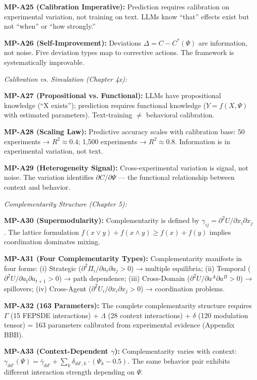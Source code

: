 \begin{tcolorbox}[colback=gray!5!white, colframe=gray!75!black,
    title=\textbf{MP Axioms}]
\textbf{MP-A25 (Calibration Imperative):} Prediction requires calibration on experimental variation, not training on text. LLMs know ``that'' effects exist but not ``when'' or ``how strongly.''

\textbf{MP-A26 (Self-Improvement):} Deviations $\Delta = C - C^*(\Psi)$ are information, not noise. Five deviation types map to corrective actions. The framework is systematically improvable.

\vspace{0.5em}
\textit{Calibration vs. Simulation (Chapter 4x):}

\textbf{MP-A27 (Propositional vs. Functional):} LLMs have propositional knowledge (``X exists''); prediction requires functional knowledge ($Y = f(X, \Psi)$ with estimated parameters). Text-training $\neq$ behavioral calibration.

\textbf{MP-A28 (Scaling Law):} Predictive accuracy scales with calibration base: 50 experiments → $R^2 \approx 0.4$; 1,500 experiments → $R^2 \approx 0.8$. Information is in experimental variation, not text.

\textbf{MP-A29 (Heterogeneity Signal):} Cross-experimental variation is signal, not noise. The variation identifies $\partial C / \partial \Psi$ --- the functional relationship between context and behavior.

\vspace{0.5em}
\textit{Complementarity Structure (Chapter 5):}

\textbf{MP-A30 (Supermodularity):} Complementarity is defined by $\gamma_{ij} = \partial^2 U / \partial x_i \partial x_j$. The lattice formulation $f(x \vee y) + f(x \wedge y) \geq f(x) + f(y)$ implies coordination dominates mixing.

\textbf{MP-A31 (Four Complementarity Types):} Complementarity manifests in four forms: (i) Strategic ($\partial^2 \Pi_i/\partial a_i \partial a_j > 0$) → multiple equilibria; (ii) Temporal ($\partial^2 U/\partial a_t \partial a_{t+1} > 0$) → path dependence; (iii) Cross-Domain ($\partial^2 U/\partial a^A \partial a^B > 0$) → spillovers; (iv) Cross-Agent ($\partial^2 U_i/\partial x_i \partial x_j > 0$) → coordination problems.

\textbf{MP-A32 (163 Parameters):} The complete complementarity structure requires $\Gamma$ (15 FEPSDE interactions) + $\Lambda$ (28 context interactions) + $\delta$ (120 modulation tensor) = 163 parameters calibrated from experimental evidence (Appendix BBB).

\textbf{MP-A33 (Context-Dependent $\gamma$):} Complementarity varies with context: $\gamma_{dd'}(\Psi) = \bar{\gamma}_{dd'} + \sum_k \delta_{dd',k} \cdot (\Psi_k - 0.5)$. The same behavior pair exhibits different interaction strength depending on $\Psi$.


\end{tcolorbox}
